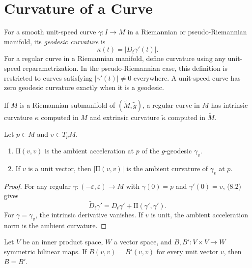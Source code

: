 \section{Curvature of a Curve}

For a smooth unit-speed curve $\gamma:I\to M$ in a Riemannian or
pseudo-Riemannian manifold, its \emph{geodesic curvature} is
\[
\kappa(t)=|D_t\gamma'(t)|.
\]
For a regular curve in a Riemannian manifold, define curvature using any
unit-speed reparametrization. In the pseudo-Riemannian case, this definition
is restricted to curves satisfying $|\gamma'(t)|\neq0$ everywhere. A
unit-speed curve has zero geodesic curvature exactly when it is a geodesic.

If $M$ is a Riemannian submanifold of
$(\widetilde M,\widetilde g)$, a regular curve in $M$ has intrinsic curvature
$\kappa$ computed in $M$ and extrinsic curvature $\widetilde\kappa$ computed
in $\widetilde M$.

\begin{proposition}
\label{prop:geometric-interpretation-ii}

Let $p\in M$ and $v\in T_pM$.
\begin{enumerate}
\item[(a)] $\mathrm{II}(v,v)$ is the ambient acceleration at $p$ of the
$g$-geodesic $\gamma_v$.
\item[(b)] If $v$ is a unit vector, then $|\mathrm{II}(v,v)|$ is the ambient
curvature of $\gamma_v$ at $p$.
\end{enumerate}
\end{proposition}

\begin{proof}
\sketch For any regular $\gamma:(-\varepsilon,\varepsilon)\to M$ with
$\gamma(0)=p$ and $\gamma'(0)=v$, (8.2) gives
\[
\widetilde D_t\gamma'
=D_t\gamma'+\mathrm{II}(\gamma',\gamma').
\]
For $\gamma=\gamma_v$, the intrinsic derivative vanishes. If $v$ is unit,
the ambient acceleration norm is the ambient curvature.
\end{proof}

\begin{lemma}
\label{lem:symmetric-bilinear-form-unit-vectors}

Let $V$ be an inner product space, $W$ a vector space, and
$B,B':V\times V\to W$ symmetric bilinear maps. If
$B(v,v)=B'(v,v)$ for every unit vector $v$, then $B=B'$.
\end{lemma}

